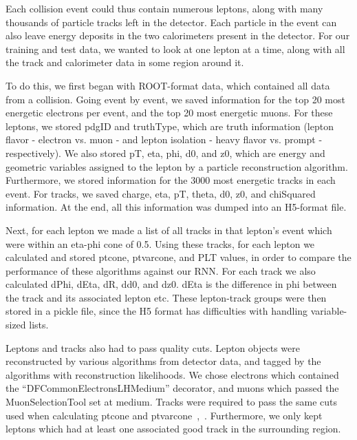 
Each collision event could thus contain numerous leptons, along with many thousands of particle tracks left in the detector. Each particle in the event can also leave energy deposits in the two calorimeters present in the detector. For our training and test data, we wanted to look at one lepton at a time, along with all the track and calorimeter data in some region around it.

To do this, we first began with ROOT-format data, which contained all data from a collision. Going event by event, we saved information for the top 20 most energetic electrons per event, and the top 20 most energetic muons. For these leptons, we stored pdgID and truthType, which are truth information (lepton flavor - electron vs. muon - and lepton isolation - heavy flavor vs. prompt - respectively). We also stored pT, eta, phi, d0, and z0, which are energy and geometric variables assigned to the lepton by a particle reconstruction algorithm. Furthermore, we stored information for the 3000 most energetic tracks in each event. For tracks, we saved charge, eta, pT, theta, d0, z0, and chiSquared information. At the end, all this information was dumped into an H5-format file.

Next, for each lepton we made a list of all tracks in that lepton's event which were within an eta-phi cone of 0.5. Using these tracks, for each lepton we calculated and stored ptcone, ptvarcone, and PLT values, in order to compare the performance of these algorithms against our RNN. For each track we also calculated dPhi, dEta, dR, dd0, and dz0. dEta is the difference in phi between the track and its associated lepton etc. These lepton-track groups were then stored in a pickle file, since the H5 format has difficulties with handling variable-sized lists.

Leptons and tracks also had to pass quality cuts. Lepton objects were reconstructed by various algorithms from detector data, and tagged by the algorithms with reconstruction likelihoods. We chose electrons which contained the “DFCommonElectronsLHMedium” decorator, and muons which passed the MuonSelectionTool set at medium. Tracks were required to pass the same cuts used when calculating ptcone and ptvarcone~\cite{ref:run2isolation},~\cite{ref:trackingcp}. Furthermore, we only kept leptons which had at least one associated good track in the surrounding region.


